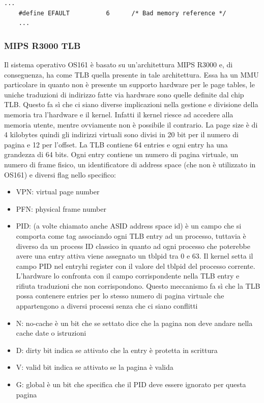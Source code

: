 \begin{lstlisting}[caption=In \lstinline{err.h} si trovano tutti i principali errori del sistema operativo]
    ...
    #define EFAULT          6      /* Bad memory reference */
    ...
\end{lstlisting}

\subsubsection{MIPS R3000 TLB}
Il sistema operativo OS161 è basato su un'architettura MIPS R3000 e, di conseguenza, ha come TLB quella presente in tale architettura. Essa ha un MMU particolare in quanto non è presente un supporto hardware per le page tables, le uniche traduzioni di indirizzo fatte via hardware sono quelle definite dal chip TLB. Questo fa sì che ci siano diverse implicazioni nella gestione e divisione della memoria tra l'hardware e il kernel. Infatti il kernel riesce ad accedere alla memoria utente, mentre ovviamente non è possibile il contrario.
La page size è di 4 kilobytes quindi gli indirizzi virtuali sono divisi in 20 bit per il numero di pagina e 12 per l'offset. La TLB contiene 64 entries e ogni entry ha una grandezza di 64 bits. Ogni entry contiene un numero di pagina virtuale, un numero di frame fisico, un identificatore di address space (che non è utilizzato in OS161)  e diversi flag nello specifico:
\begin{itemize}
    \item VPN: virtual page number
    \item PFN: physical frame number
    \item PID: (a volte chiamato anche ASID address space id) è un campo che si comporta come tag associando ogni TLB entry ad un processo, tuttavia è diverso da un process ID classico in quanto ad ogni processo che poterebbe avere una entry attiva viene assegnato un tblpid tra 0 e 63. Il kernel setta il campo PID nel entryhi register con il valore del tblpid  del processo corrente. L'hardware lo confronta con il campo corrispondente nella TLB entry e rifiuta traduzioni che non corrispondono. Questo meccanismo fa sì che la TLB possa contenere entries per lo stesso numero di pagina virtuale che appartengono a diversi processi senza che ci siano conflitti
    \item N: no-cache è un bit che se settato dice che la pagina non deve andare nella cache date o istruzioni
    \item D: dirty bit indica se attivato che la entry è protetta in scrittura
    \item V: valid bit indica se attivato se la pagina è valida
    \item G: global è un bit che specifica che il PID deve essere ignorato per questa pagina
\end{itemize}

